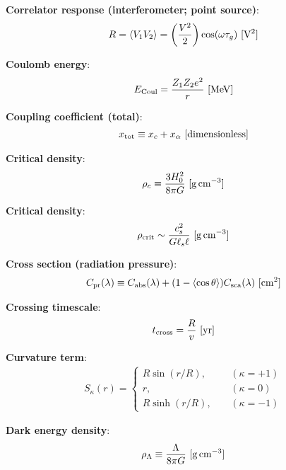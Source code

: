 \documentclass[a4paper,10pt]{article}
\begin{document}
{\noindent}\textbf{Correlator response (interferometer; point source)}:
\begin{align*}
    R = \langle V_1V_2 \rangle = \left(\frac{V^2}{2}\right)\cos(\omega\tau_g) ~ [{\rm V^2}]
\end{align*}

{\noindent}\textbf{Coulomb energy}:
\begin{align*}
    E_{\rm Coul} = \frac{Z_1Z_2e^2}{r} ~ [{\rm MeV}]
\end{align*}

{\noindent}\textbf{Coupling coefficient (total)}:
\begin{align*}
    x_\mathrm{tot} \equiv x_c + x_\alpha ~ [{\rm dimensionless}]
\end{align*}

{\noindent}\textbf{Critical density}:
\begin{align*}
    \rho_c \equiv \dfrac{3H_0^2}{8\pi G}  ~ [{\rm g\,cm^{-3}}]
\end{align*}

{\noindent}\textbf{Critical density}:
\begin{align*}
    \rho_\mathrm{crit} \sim \frac{c_s^2}{G\ell_s\ell} ~ [{\rm g\,cm^{-3}}]
\end{align*}

{\noindent}\textbf{Cross section (radiation pressure)}:
\begin{align*}
   C_{\rm pr}(\lambda) \equiv C_{\rm abs}(\lambda) + (1-\langle\cos\theta\rangle)C_{\rm sca}(\lambda) ~ [{\rm cm^2}]
\end{align*}

{\noindent}\textbf{Crossing timescale}:
\begin{align*}
    t_\mathrm{cross} = \frac{R}{v} ~ [{\rm yr}]
\end{align*}

{\noindent}\textbf{Curvature term}:
\begin{align*}
S_\kappa(r) =
\left\{
\begin{aligned}
R\sin(r/R), ~~~~~& (\kappa = +1) \\
          r,~~~~~& (\kappa = 0) \\
R\sinh(r/R),~~~~~& (\kappa = -1)
\end{aligned}
\right.
\end{align*}

{\noindent}\textbf{Dark energy density}:
\begin{align*}
    \rho_\Lambda \equiv \dfrac{\Lambda}{8\pi G} ~ [{\rm g\,cm^{-3}}]
\end{align*}
\end{document}
